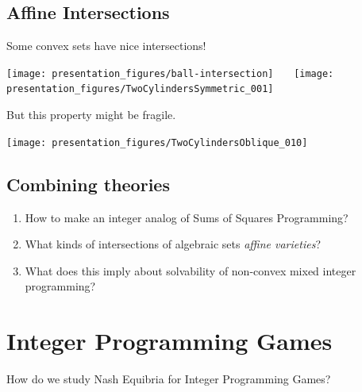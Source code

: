 \documentclass{article}
\begin{document}
\begin{center}
%

\end{center}


\newpage
\subsection*{Affine Intersections}

Some convex sets have nice intersections!
\begin{center}
\texttt{[image: presentation\_figures/ball-intersection]} \ \ \ 
\texttt{[image: presentation\_figures/TwoCylindersSymmetric\_001]}
\end{center}
But this property might be fragile.
\begin{center}
\texttt{[image: presentation\_figures/TwoCylindersOblique\_010]}
\end{center}


\subsection*{Combining theories}

\begin{enumerate}
\item How to make an integer analog of Sums of Squares Programming?
\item What kinds of intersections of algebraic sets \emph{affine varieties}?
\item What does this imply about solvability of non-convex mixed integer programming?
\end{enumerate}
\newpage

\section{Integer Programming Games}
How do we study Nash Equibria for Integer Programming Games?
\end{document}
